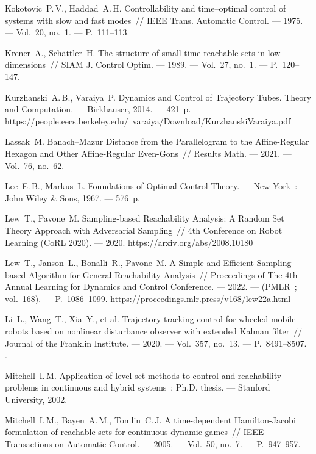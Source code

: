 \documentclass[../main.tex]{subfiles}
\begin{document}
\begin{thebibliography}{99}
Kokotovic~P.\,V., Haddad~A.\,H. Controllability and time–optimal control of systems with slow and fast modes~// IEEE Trans. Automatic Control. --- 1975. --- Vol.~20, no.~1. --- P.~111--113.


Krener~A., Sch\"{a}ttler~H. The structure of small-time reachable sets in low dimensions~// SIAM J. Control Optim. --- 1989. --- Vol.~27, no.~1. --- P.~120--147. 

Kurzhanski~A.\,B., Varaiya~P. Dynamics and Control of Trajectory Tubes. Theory and Computation. --- Birkhauser, 2014. --- 421~p.\\ https://people.eecs.berkeley.edu/~varaiya/Download/KurzhanskiVaraiya.pdf

Lassak~M. Banach–Mazur Distance from the Parallelogram to the Affine-Regular Hexagon and Other Affine-Regular Even-Gons~// Results Math. --- 2021. --- Vol.~76, no.~62. 

Lee~E.\,B., Markus~L. Foundations of Optimal Control Theory. --- New York~: John Wiley \& Sons, 1967. --- 576~p.

Lew~T., Pavone~M. Sampling-based Reachability Analysis: A Random Set Theory Approach with Adversarial Sampling~// 4th Conference on Robot Learning (CoRL 2020). --- 2020.
https://arxiv.org/abs/2008.10180

Lew~T., Janson~L., Bonalli~R., Pavone~M. A Simple and Efficient Sampling-based Algorithm for General Reachability Analysis~// Proceedings of The 4th Annual Learning for Dynamics and Control Conference. --- 2022. --- (PMLR~; vol.~168). --- P.~1086--1099. https://proceedings.mlr.press/v168/lew22a.html

Li~L., Wang~T., Xia~Y., et al. Trajectory tracking control for wheeled mobile robots based on nonlinear disturbance observer with extended Kalman filter~// Journal of the Franklin Institute. --- 2020. --- Vol.~357, no.~13. --- P.~8491--8507.
 .

Mitchell~I.\,M. Application of level set methods to control and reachability problems in continuous and hybrid systems~: Ph.D. thesis. --- Stanford University, 2002.

Mitchell~I.\,M., Bayen~A.\,M., Tomlin~C.\,J. A time-dependent Hamilton-Jacobi formulation of reachable sets for continuous dynamic games~// IEEE Transactions on Automatic Control. --- 2005. --- Vol.~50, no.~7. --- P.~947--957.


\end{thebibliography}
\end{document}
